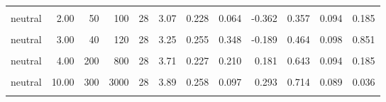 \documentclass[
]{article}
\begin{document}
\begin{longtable}[t]{lrrrrrrlrrrl}
\hspace{1em}\cellcolor{gray!10}{neutral} & \cellcolor{gray!10}{2.00} & \cellcolor{gray!10}{20} & \cellcolor{gray!10}{40} & \cellcolor{gray!10}{30} & \cellcolor{gray!10}{3.20} & \cellcolor{gray!10}{0.226} & \cellcolor{gray!10}{0.384} & \cellcolor{gray!10}{-0.247} & \cellcolor{gray!10}{0.467} & \cellcolor{gray!10}{0.094} & \cellcolor{gray!10}{0.856}\\
\hspace{1em}neutral & 2.00 & 50 & 100 & 28 & 3.07 & 0.228 & 0.064 & -0.362 & 0.357 & 0.094 & 0.185\\
\hspace{1em}\cellcolor{gray!10}{neutral} & \cellcolor{gray!10}{3.00} & \cellcolor{gray!10}{10} & \cellcolor{gray!10}{30} & \cellcolor{gray!10}{30} & \cellcolor{gray!10}{3.40} & \cellcolor{gray!10}{0.242} & \cellcolor{gray!10}{0.874} & \cellcolor{gray!10}{-0.077} & \cellcolor{gray!10}{0.567} & \cellcolor{gray!10}{0.094} & \cellcolor{gray!10}{0.585}\\
\hspace{1em}neutral & 3.00 & 40 & 120 & 28 & 3.25 & 0.255 & 0.348 & -0.189 & 0.464 & 0.098 & 0.851\\
\hspace{1em}\cellcolor{gray!10}{neutral} & \cellcolor{gray!10}{4.00} & \cellcolor{gray!10}{20} & \cellcolor{gray!10}{80} & \cellcolor{gray!10}{30} & \cellcolor{gray!10}{3.83} & \cellcolor{gray!10}{0.313} & \cellcolor{gray!10}{0.283} & \cellcolor{gray!10}{0.198} & \cellcolor{gray!10}{0.600} & \cellcolor{gray!10}{0.093} & \cellcolor{gray!10}{0.362}\\
\hspace{1em}neutral & 4.00 & 200 & 800 & 28 & 3.71 & 0.227 & 0.210 & 0.181 & 0.643 & 0.094 & 0.185\\
\hspace{1em}\cellcolor{gray!10}{neutral} & \cellcolor{gray!10}{10.00} & \cellcolor{gray!10}{40} & \cellcolor{gray!10}{400} & \cellcolor{gray!10}{30} & \cellcolor{gray!10}{4.37} & \cellcolor{gray!10}{0.231} & \cellcolor{gray!10}{0.001} & \cellcolor{gray!10}{0.696} & \cellcolor{gray!10}{0.767} & \cellcolor{gray!10}{0.080} & \cellcolor{gray!10}{0.005}\\
\hspace{1em}neutral & 10.00 & 300 & 3000 & 28 & 3.89 & 0.258 & 0.097 & 0.293 & 0.714 & 0.089 & 0.036\\
\hspace{1em}\cellcolor{gray!10}{neutral} & \cellcolor{gray!10}{15.00} & \cellcolor{gray!10}{20} & \cellcolor{gray!10}{300} & \cellcolor{gray!10}{28} & \cellcolor{gray!10}{3.82} & \cellcolor{gray!10}{0.277} & \cellcolor{gray!10}{0.171} & \cellcolor{gray!10}{0.223} & \cellcolor{gray!10}{0.679} & \cellcolor{gray!10}{0.092} & \cellcolor{gray!10}{0.087}\\

\end{longtable}
\end{document}
